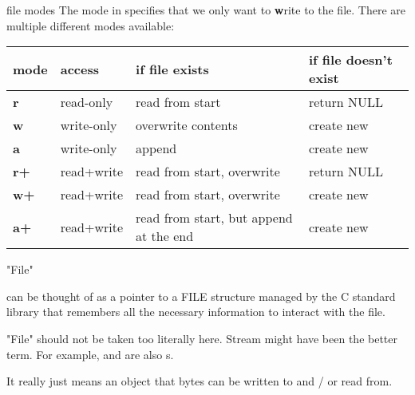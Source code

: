 \documentclass[10pt,graphics,aspectratio=169,table]{beamer}
\begin{document}
\begin{frame}{file modes}
    The  mode in  specifies that we
    only want to \textbf{w}rite to the file.
    There are multiple different modes available: 


    \begin{tabular}{|l|l|l|l|}
        \hline 
        \textbf{mode} & \textbf{access} & \textbf{if file exists} & \textbf{if file doesn't exist}\\ \hline 
        \textbf{r} & read-only & read from start & return NULL \\\hline
        \textbf{w} & write-only & overwrite contents & create new \\\hline
        \textbf{a} & write-only & append & create new \\\hline
        \textbf{r+} & read+write & read from start, overwrite & return NULL \\\hline
        \textbf{w+} & read+write & read from start, overwrite & create new \\\hline
        \textbf{a+} & read+write & read from start, but append at the end& create new \\\hline
    \end{tabular}
\end{frame}

\begin{frame}[fragile]{"File"}
    
     can be thought of as a pointer to a FILE structure managed
    by the C standard library that remembers all the necessary information
    to interact with the file. 
    
    "File" should not be taken too literally here.
    Stream might have been the better term.
    For example,  and  are also s.

    It really just means an object that bytes 
    can be written to and / or read from.

\end{frame}
\end{document}
